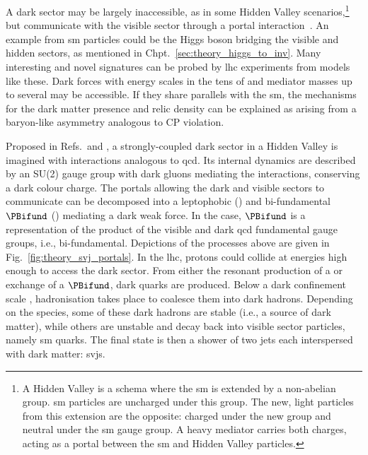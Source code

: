 A dark sector may be largely inaccessible, as in some Hidden Valley scenarios,\footnote{A Hidden Valley is a schema where the \acrlong{sm} is extended by a non-abelian group. \acrshort{sm} particles are uncharged under this group. The new, light particles from this extension are the opposite: charged under the new group and neutral under the \acrshort{sm} gauge group. A heavy mediator carries both charges, acting as a portal between the \acrlong{sm} and Hidden Valley particles.} but communicate with the visible sector through a portal interaction~\cite{Strassler:2006im}. An example from \acrshort{sm} particles could be the Higgs boson bridging the visible and hidden sectors, as mentioned in Chpt.~\ref{sec:theory_higgs_to_inv}. Many interesting and novel signatures can be probed by \acrshort{lhc} experiments from models like these. Dark forces with energy scales in the tens of \GeVns and mediator masses up to several \TeVns may be accessible. If they share parallels with the \acrlong{sm}, the mechanisms for the dark matter presence and relic density can be explained as arising from a baryon-like asymmetry analogous to CP violation.

Proposed in Refs.~and , a strongly-coupled dark sector in a Hidden Valley is imagined with interactions analogous to \acrshort{qcd}. Its internal dynamics are described by an SU(2) gauge group with dark gluons mediating the interactions, conserving a dark colour charge. The portals allowing the dark and visible sectors to communicate can be decomposed into a leptophobic \PZprime (\schannel) and bi-fundamental $\PBifund$ (\tchannel) mediating a dark weak force. In the \tchannel case, $\PBifund$ is a representation of the product of the visible and dark \acrshort{qcd} fundamental gauge groups, i.e., bi-fundamental. Depictions of the processes above are given in Fig.~\ref{fig:theory_svj_portals}. In the \acrshort{lhc}, protons could collide at energies high enough to access the dark sector. From either the resonant production of a \PZprime or exchange of a $\PBifund$, dark quarks \Pqdark are produced. Below a dark confinement scale \lamDark, hadronisation takes place to coalesce them into dark hadrons. Depending on the species, some of these dark hadrons are stable (i.e., a source of dark matter), while others are unstable and decay back into visible sector particles, namely \acrlong{sm} quarks. The final state is then a shower of two \glspl{jet} each interspersed with dark matter: \glspl{svj}.

